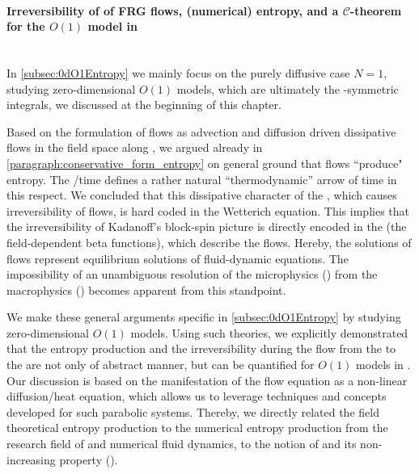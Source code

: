 \paragraph{Irreversibility of of FRG flows, (numerical) entropy, and a $\mathcal{C}$-theorem for the $O(1)$ model in \dzero{}}\label{paragraph:0dconclusionEntropy}\mbox{}\\
In \cref{subsec:0dO1Entropy} we mainly focus on the purely diffusive case $N=1$, \viz{} studying zero-dimensional $O(1)$ models, which are ultimately the \ZII{}-symmetric integrals, we discussed at the beginning of this chapter.

Based on the formulation of \frg{} flows as advection and diffusion driven dissipative flows in the field space along \rgscale{}, we argued already in \cref{paragraph:conservative_form_entropy} on general ground that \grg{} flows ``produce" entropy.
The \rgscale{}/time defines a rather natural ``thermodynamic'' arrow of time in this respect.
We concluded that this dissipative character of the \grg{}, which causes irreversibility of \frg{} flows, is hard coded in the Wetterich equation.
This implies that the irreversibility of Kadanoff's block-spin picture is directly encoded in the \pdes{} (the field-dependent beta functions), which describe the \frg{} flows.
Hereby, the \ir{} solutions of \frg{} flows represent equilibrium solutions of fluid-dynamic equations.
The impossibility of an unambiguous resolution of the microphysics (\uv{}) from the macrophysics (\ir{}) becomes apparent from this standpoint. 

We make these general arguments specific in \cref{subsec:0dO1Entropy} by studying zero-dimensional $O(1)$ models.
Using such theories, we explicitly demonstrated that the entropy production and the irreversibility during the \frg{} flow from the \uv{} to the \ir{} are not only of abstract manner, but can be quantified for $O(1)$ models in \dzero{}.
Our discussion is based on the manifestation of the flow equation as a non-linear diffusion/heat equation, which allows us to leverage \cfd{} techniques and concepts developed for such parabolic systems. 
Thereby, we directly related the field theoretical entropy production to the numerical entropy production from the research field of \pdes{} and numerical fluid dynamics, \viz{} to the \cfd{} notion of  and its non-increasing property (\tvni{}).


